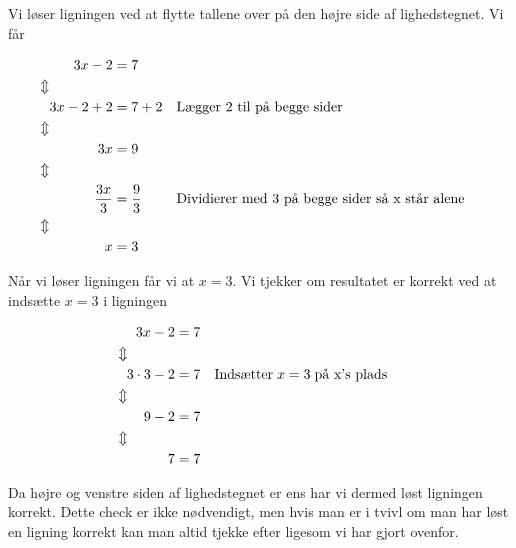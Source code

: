 Vi løser ligningen ved at flytte tallene over på den højre side af lighedstegnet. Vi får

\begin{align*}
3x - 2 &= 7\\
\Updownarrow \hspace*{16mm} &\\
3x - 2 + 2 &= 7 + 2 && \text{Lægger 2 til på begge sider}\\
\Updownarrow \hspace*{16mm} &\\
3x &= 9\\
\Updownarrow \hspace*{16mm} &\\
\frac{3x}{3} &= \frac{9}{3} && \text{Dividierer med 3 på begge sider så x står alene}\\
\Updownarrow \hspace*{16mm} &\\
x &= 3
\end{align*}

Når vi løser ligningen får vi at $x = 3$. Vi tjekker om resultatet er korrekt ved at indsætte $x = 3$ i ligningen

\begin{align*}
3x - 2 &= 7\\
\Updownarrow \hspace*{12mm} &\\
3\cdot 3 - 2 &= 7 && \text{Indsætter} \hspace*{1mm} x = 3 \hspace*{1mm} \text{på x's plads}\\
\Updownarrow \hspace*{12mm} &\\
9 - 2 &= 7\\
\Updownarrow \hspace*{12mm} &\\
7 &= 7
\end{align*}

Da højre og venstre siden af lighedstegnet er ens har vi dermed løst ligningen korrekt. Dette check er ikke nødvendigt, men hvis man er i tvivl om man har løst en ligning korrekt kan man altid tjekke efter ligesom vi har gjort ovenfor.
